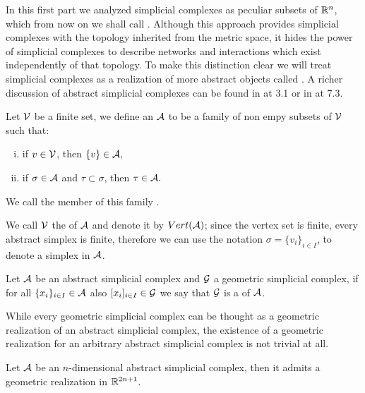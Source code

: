 \documentclass[../1.tex]{subfiles}
\begin{document}
    In this first part we analyzed simplicial complexes as peculiar subsets of $\mathbb{R}^n$, which from now on we shall call .
    Although this approach provides simplicial complexes with the topology inherited from the metric space, it hides the power of simplicial complexes 
    to describe networks and interactions which exist independently of that topology. To make this distinction clear we will treat
    simplicial complexes as a realization of more abstract objects called . A richer discussion of abstract simplicial complexes
    can be found in \cite{comptop} at 3.1 or in \cite{rotman} at 7.3.
    
    \begin{defn}
        Let $\mathcal{V}$ be a finite set, we define an  $\mathcal{A}$ to be 
        a family of non empy subsets of $\mathcal{V}$ such that:
        \begin{enumerate}[(i)]
            \item if $v \in \mathcal{V}$, then $\{v\} \in \mathcal{A},$
            \item if $\sigma \in \mathcal{A}$ and $\tau \subset \sigma$, then $\tau \in \mathcal{A}.$
        \end{enumerate}
        We call the member of this family .
    \end{defn}
    
    We call $\mathcal{V}$ the  of $\mathcal{A}$ and denote it by $Vert(\mathcal{A})$; since the vertex
    set is finite, every abstract simplex is finite, therefore we can use the notation $\sigma = \{ v_i \}_{i \in I}$, to denote a simplex in $\mathcal{A}$.
    
    \begin{defn}
        Let $\mathcal{A}$ be an abstract simplicial complex and $\mathcal{G}$ a geometric simplicial complex, if for all $\{x_i\}_{i \in I} \in \mathcal{A}$ also $[x_i]_{i \in I} \in \mathcal{G}$
        we say that $\mathcal{G}$ is a  of $\mathcal{A}$.
    \end{defn}

    While every geometric simplicial complex can be thought as a geometric realization of an abstract simplicial complex, the existence of a geometric 
    realization for an arbitrary abstract simplicial complex is not trivial at all.

    \begin{thm}
        \label{thm:2}
        Let $\mathcal{A}$ be an $n$-dimensional abstract simplicial complex, then it admits a geometric realization in $\mathbb{R}^{2n+1}$.
    \end{thm}
\end{document}
